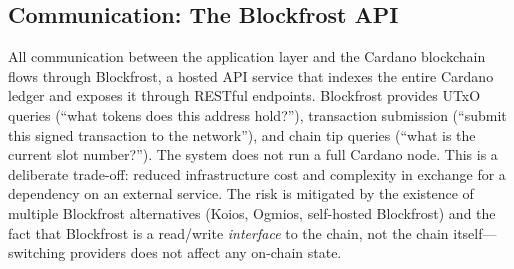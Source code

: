\subsection{Communication: The Blockfrost API}

All communication between the application layer and the Cardano blockchain flows through Blockfrost, a hosted API service that indexes the entire Cardano ledger and exposes it through RESTful endpoints. Blockfrost provides UTxO queries (``what tokens does this address hold?''), transaction submission (``submit this signed transaction to the network''), and chain tip queries (``what is the current slot number?''). The system does not run a full Cardano node. This is a deliberate trade-off: reduced infrastructure cost and complexity in exchange for a dependency on an external service. The risk is mitigated by the existence of multiple Blockfrost alternatives (Koios, Ogmios, self-hosted Blockfrost) and the fact that Blockfrost is a read/write \emph{interface} to the chain, not the chain itself---switching providers does not affect any on-chain state.

